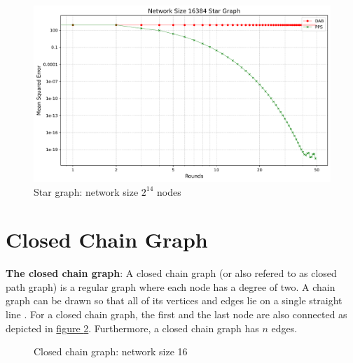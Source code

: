 \begin{figure}[H]
    \centering
    \includegraphics[scale=0.5]{figures/starGraphSimulations/DAB_vs_PPS_SG_r50_n16384.png}
    \caption{Star graph: network size $2^{14}$ nodes}
    \label{fig:16384StarGraph}
\end{figure}

\section{Closed Chain Graph}
\textbf{The closed chain graph}: A closed chain graph (or also refered to as closed path graph) is a regular graph where each node has a degree of two. A chain graph can be drawn so that all of its vertices and edges lie on a single straight line \cite{gross1998graph}. For a closed chain graph, the first and the last node are also connected as depicted in \hyperref[fig:closedChainGraphDemo]{figure } \ref{fig:closedChainGraphDemo}. Furthermore, a closed chain graph has $n$ edges.
\begin{figure}
    \centering
    \scalebox{0.8}{}
    \caption{Closed chain graph: network size 16}
    \label{fig:closedChainGraphDemo}
\end{figure}
